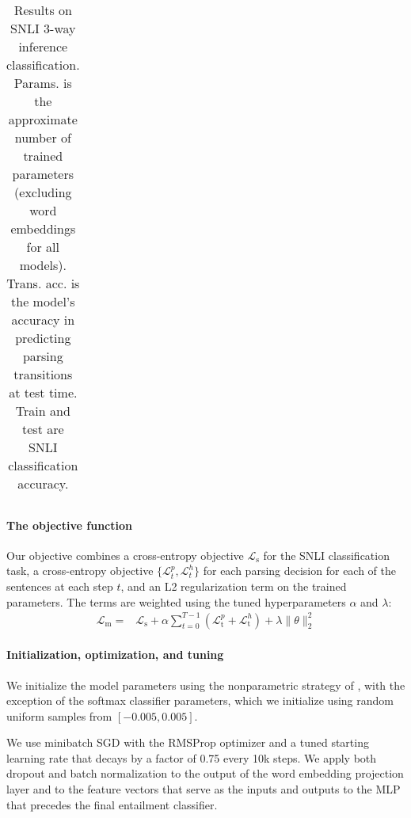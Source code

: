 \documentclass[11pt]{article}
\begin{document}
\begin{table*}[t]
\begin{tabular}{lrrrr}
    \bottomrule
  \end{tabular}
\caption{\protect\label{tab:results}Results on SNLI 3-way inference classification. Params. is the approximate number of trained parameters (excluding word embeddings for all models). Trans. acc. is the model's accuracy in predicting parsing transitions at test time. Train and test are SNLI classification accuracy.} 
\end{table*}


\paragraph{The objective function} Our objective combines a cross-entropy objective $\mathcal{L}_{\text{s}}$ for the SNLI classification task, a cross-entropy objective $\{\mathcal{L}_t^p, \mathcal{L}_t^h\}$ for each parsing decision for each of the sentences at each step $t$, and an L2 regularization term on the trained parameters. The terms are weighted using the tuned hyperparameters $\alpha$ and $\lambda$:
\begin{equation}
\begin{split}
\mathcal{L}_{\text{m}} = &\mathcal{L}_{\text{s}} + \alpha \sum_{t=0}^{T-1} (\mathcal{L}_{\text{t}}^{p} + \mathcal{L}_{\text{t}}^{h}) + \lambda \|\theta\|^2_2
\end{split}
\end{equation}

\paragraph{Initialization, optimization, and tuning}

We initialize the model parameters using the nonparametric strategy of \citet{DBLP:journals/corr/HeZR015}, with the exception of the softmax classifier parameters, which we initialize using random uniform samples from $[-0.005, 0.005]$.

We use minibatch SGD with the RMSProp optimizer \citep{tieleman2012lecture} and a tuned starting learning rate that decays by a factor of 0.75 every 10k steps. We apply both dropout \citep{srivastava2014dropout} and batch normalization \citep{2015SIoffeCSzegedy} to the output of the word embedding projection layer and to the feature vectors that serve as the inputs and outputs to the MLP that precedes the final entailment classifier.
\end{document}

